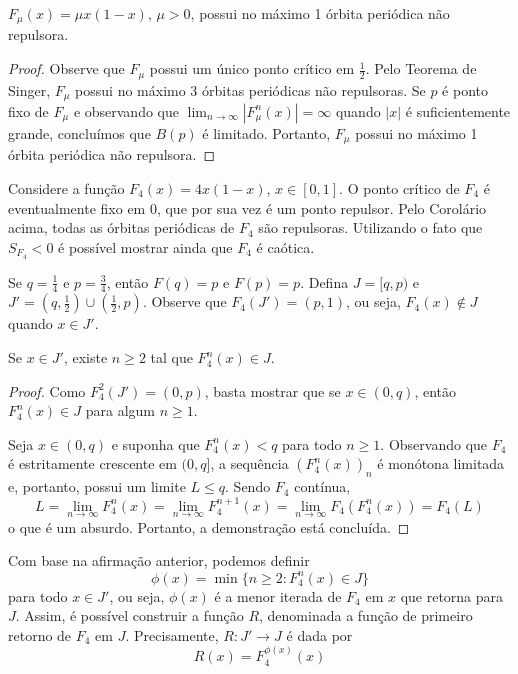 \begin{corollary}
$F_\mu(x) = \mu x(1-x)$, $\mu > 0$, possui no máximo 1 órbita periódica não repulsora.
\end{corollary}

\begin{proof}
Observe que $F_\mu$ possui um único ponto crítico em $\frac{1}{2}$. Pelo Teorema de Singer, $F_\mu$ possui no máximo 3 órbitas periódicas não repulsoras. Se $p$ é ponto fixo de $F_\mu$ e observando que $\lim_{n \to\infty} |F^n_\mu(x)| = \infty$ quando $|x|$ é suficientemente grande, concluímos que $B(p)$ é limitado. Portanto, $F_\mu$ possui no máximo 1 órbita periódica não repulsora.
\end{proof}

Considere a função $F_4(x) = 4x(1-x)$, $x \in [0,1]$. O ponto crítico de $F_4$ é eventualmente fixo em 0, que por sua vez é um ponto repulsor. Pelo Corolário acima, todas as órbitas periódicas de $F_4$ são repulsoras. Utilizando o fato que $S_{F_4} < 0$ é possível mostrar ainda que $F_4$ é caótica. 

Se $q=\frac{1}{4}$ e $p=\frac{3}{4}$, então $F(q)=p$ e $F(p)=p$. Defina $J = [q, p)$ e $J' = \left( q,\frac{1}{2} \right) \cup \left( \frac{1}{2}, p \right)$. Observe que $F_4(J') = \left ( p ,1 \right )$, ou seja, $F_4(x) \notin J$ quando $x \in J'$.

\begin{affirmation}
Se $x \in J'$, existe $n \geq 2$ tal que $F_4^n(x) \in J$.
\end{affirmation}

\begin{proof}
Como $F_4^2(J') = (0, p)$, basta mostrar que se $x \in (0, q)$, então $F_4^n(x) \in J$ para algum $n \geq 1$.

Seja $x \in (0,q)$ e suponha que $F_4^n(x) < q$ para todo $n \geq 1$. Observando que $F_4$ é estritamente crescente em $(0,q]$, a sequência $(F_4^n(x))_n$ é monótona limitada e, portanto, possui um limite $L \leq q$. Sendo $F_4$ contínua,
$$L = \lim_{n \to \infty} F_4^n(x) = \lim_{n \to \infty} F_4^{n+1}(x) = \lim_{n \to \infty} F_4(F_4^n(x)) = F_4(L)$$
o que é um absurdo. Portanto, a demonstração está concluída.
\end{proof}

Com base na afirmação anterior, podemos definir
$$\phi(x) = \min \{ n \geq 2 : F_4^n(x) \in J \}$$
para todo $x \in J'$, ou seja, $\phi(x)$ é a menor iterada de $F_4$ em $x$ que retorna para $J$.  Assim, é possível construir a função $R$, denominada a função de primeiro retorno de $F_4$ em $J$. Precisamente, $R: J' \to J$ é dada por
$$R(x) = F_4^{\phi(x)}(x)$$

